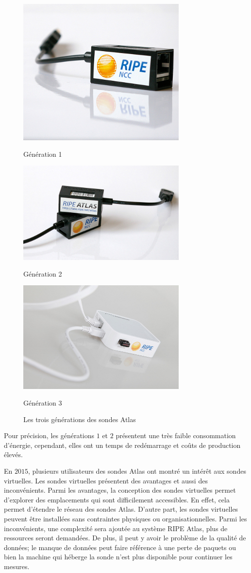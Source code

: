 \begin{figure}[H]
	
	\parbox{.32\textwidth}{\includegraphics[width=.30\textwidth, height=.20\textwidth]{illustrations/v1} 	\captionsetup{justification=centering}\caption{Génération 1}}
	\hfill
	\parbox{.32\textwidth}{\includegraphics[width=.30\textwidth, height=.20\textwidth]{illustrations/v2}
		\captionsetup{justification=centering}
		\caption{Génération 2}}
	\hfill
	\parbox{.32\textwidth}{\includegraphics[width=.30\textwidth,height=.20\textwidth]{illustrations/v3} 	\captionsetup{justification=centering}\caption{Génération 3}}
	\caption{Les trois générations des sondes Atlas}
	\label{fig:genarations}
\end{figure}

Pour précision, les générations $1$ et $2$ présentent une très faible consommation d'énergie, cependant, elles ont un temps de redémarrage et coûts de production élevés. 


En $2015$, plusieurs utilisateurs des sondes  Atlas ont montré un intérêt aux sondes virtuelles. Les sondes virtuelles présentent des avantages et aussi des inconvénients. Parmi les avantages, la conception des sondes virtuelles permet d'explorer des emplacements qui sont difficilement accessibles. En effet, cela permet d'étendre le réseau des sondes  Atlas. D'autre part, les sondes virtuelles peuvent être installées sans contraintes physiques ou organisationnelles. Parmi les inconvénients, une complexité sera ajoutée au système RIPE Atlas, plus de ressources seront demandées. De plus, il peut y avoir le problème de la qualité de données; le manque de données peut faire référence à une perte de paquets ou bien la machine qui héberge la sonde n'est plus disponible pour continuer les mesures. 


